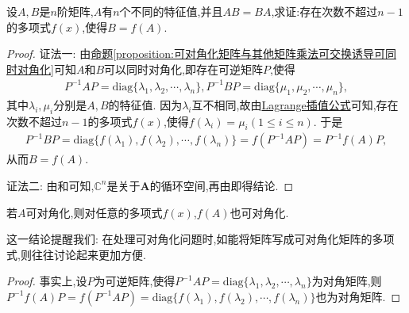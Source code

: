 \documentclass[../../main.tex]{subfiles}%
\begin{document}
\begin{proposition}\label{proposition:有n个不同特征值的矩阵乘法可交换诱导多项式表示}
设$A,B$是$n$阶矩阵,$A$有$n$个不同的特征值,并且$AB = BA$,求证:存在次数不超过$n - 1$的多项式$f(x)$,使得$B = f(A)$.
\end{proposition}
\begin{proof}

{\color{blue}证法一:}
由\hyperref[proposition:可对角化矩阵与其他矩阵乘法可交换诱导可同时对角化]{命题\ref{proposition:可对角化矩阵与其他矩阵乘法可交换诱导可同时对角化}}可知$A$和$B$可以同时对角化,即存在可逆矩阵$P$,使得
\begin{align*}
P^{-1}AP=\mathrm{diag}\{\lambda_1,\lambda_2,\cdots,\lambda_n\}, P^{-1}BP=\mathrm{diag}\{\mu_1,\mu_2,\cdots,\mu_n\},
\end{align*}
其中$\lambda_i,\mu_i$分别是$A,B$的特征值. 因为$\lambda_i$互不相同,故由\hyperref[theorem:Lagrange插值公式]{Lagrange插值公式}可知,存在次数不超过$n - 1$的多项式$f(x)$,使得$f(\lambda_i)=\mu_i(1\leqslant  i\leqslant  n)$. 于是
\begin{align*}
P^{-1}BP=\mathrm{diag}\{f(\lambda_1),f(\lambda_2),\cdots,f(\lambda_n)\}=f(P^{-1}AP)=P^{-1}f(A)P,
\end{align*}
从而$B = f(A)$.

{\color{blue}证法二:}
由和可知,$\mathbb{C}^n$是关于$\mathbf{A}$的循环空间,再由即得结论.

\end{proof}

\begin{proposition}\label{proposition:矩阵A可对角化则f(A)也可对角化}
若$A$可对角化,则对任意的多项式$f(x)$,$f(A)$也可对角化.
\end{proposition}
\begin{note}
这一结论提醒我们: 在处理可对角化问题时,如能将矩阵写成可对角化矩阵的多项式,则往往讨论起来更加方便.
\end{note}
\begin{proof}

事实上,设$P$为可逆矩阵,使得$P^{-1}AP=\mathrm{diag}\{\lambda_1,\lambda_2,\cdots,\lambda_n\}$为对角矩阵,则$P^{-1}f(A)P=f(P^{-1}AP)=\mathrm{diag}\{f(\lambda_1),f(\lambda_2),\cdots,f(\lambda_n)\}$也为对角矩阵.

\end{proof}
\end{document}

